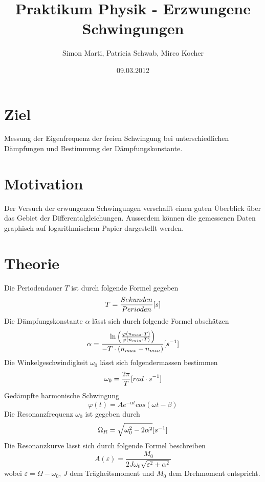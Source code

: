 \documentclass[12pt,a4paper]{article}
\title{Praktikum Physik - Erzwungene Schwingungen}
\author{Simon Marti, Patricia Schwab, Mirco Kocher}
\date{09.03.2012}
\begin{document}
\maketitle

\section*{Ziel}
Messung der Eigenfrequenz der freien Schwingung bei unterschiedlichen D\"ampfungen und Bestimmung der D\"ampfungskonstante.

\section*{Motivation}
Der Versuch der erwungenen Schwingungen verschafft einen guten \"Uberblick \"uber das Gebiet der Differentalgleichungen. Ausserdem k\"onnen die gemessenen Daten graphisch auf logarithmischem Papier dargestellt werden. 

\section*{Theorie}
Die Periodendauer $T$ ist durch folgende Formel gegeben
\begin{equation}
T = \frac{Sekunden}{Perioden} \mbox [{s}]
\end{equation}
Die D\"ampfungskonstante $\alpha$ l\"asst sich durch folgende Formel absch\"atzen
\begin{equation}
\alpha = \frac{\ln\left( \frac{\varphi(n_{max} \cdot T)}{\varphi(n_{min} \cdot T)}\right)}{-T\cdot (n_{max} - n_{min})} \mbox [{s}^{-1}]
\end{equation}
Die Winkelgeschwindigkeit $\omega_0$ l\"asst sich folgendermassen bestimmen
\begin{equation}
\omega_0 = \frac{2\pi}{T} \mbox[{rad \cdot s}^{-1}]
\end{equation}
Ged\"ampfte harmonische Schwingung
\begin{equation}\label{eq:phi}
\varphi(t) = Ae^{-\alpha t}cos(\omega t - \beta)
\end{equation}
Die Resonanzfrequenz $\omega_0$ ist gegeben durch
\begin{equation}\label{eq:omega}
\Omega_R = \sqrt{\omega_0^2 - 2\alpha^2} \mbox [{s}^{-1}]
\end{equation}
Die Resonanzkurve l\"asst sich durch folgende Formel beschreiben
\begin{equation}\label{eq:a}
A(\varepsilon) = \frac{M_0}{2J\omega_0\sqrt{\varepsilon^2 + \alpha^2}}
\end{equation}
wobei $\varepsilon = \Omega - \omega_0$, $J$ dem Tr\"agheitsmoment und $M_0$ dem Drehmoment entspricht.
\end{document}

